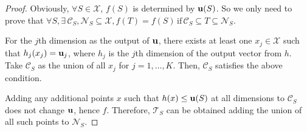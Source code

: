 \begin{proof}
Obviously, $\forall S\in \mathcal{X}$, $f(S)$ is determined by $\mathbf u(S)$. So we only need to prove that 
$\forall S, \exists\,\mathcal{C}_S, \mathcal{N}_S\subseteq \mathcal{X}, f(T)=f(S)\,\mbox{if}\,\mathcal{C}_S\subseteq T\subseteq \mathcal{N}_S$. 

For the $j$th dimension as the output of $\mathbf u$, there exists at least one $x_j \in \mathcal{X}$ such that $h_j(x_j)=\mathbf u_j$, where $h_j$ is the $j$th dimension of the output vector from $h$. Take $\mathcal{C}_S$ as the union of all $x_j$ for $j=1,\ldots,K$. Then, $\mathcal{C}_S$ satisfies the above condition. 

Adding any additional points $x$ such that $h(x)\le \mathbf u(S)$ at all dimensions to $\mathcal{C}_S$ does not change $\mathbf u$, hence $f$. Therefore, $\mathcal{T}_S$ can be obtained adding the union of all such points to $\mathcal{N}_S$.




\end{proof}